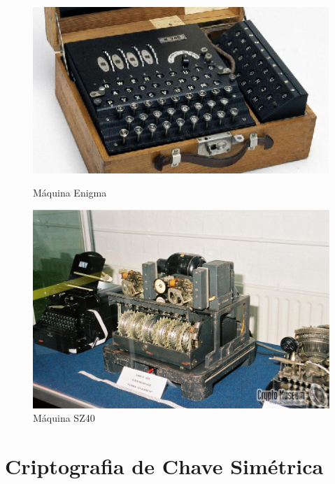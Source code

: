 \begin{figure}[h]
\centering
\begin{minipage}{.5\textwidth}
  \centering
  \includegraphics[keepaspectratio=true,scale=1]
  {figuras/enigma.eps}
  \caption[{Máquina Enigma}]{Máquina Enigma\protect\footnotemark}
  \label{enigma-machine}
\end{minipage}%
\begin{minipage}{.5\textwidth}
  \centering
  \includegraphics[keepaspectratio=true,scale=0.1]
  {figuras/sz40.eps}
  \caption[{Máquina SZ40}]{Máquina SZ40\protect\footnotemark}
    \label{sz40-machine}
\end{minipage}
\end{figure}
%

\section{Criptografia de Chave Simétrica}
\label{symmetric-cryptography}

